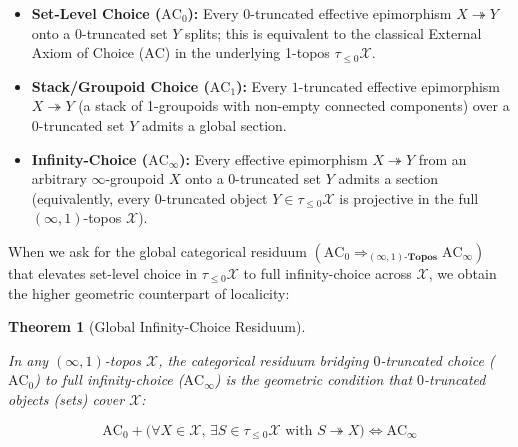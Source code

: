 \documentclass[10pt,twoside,openright]{book}
\theoremstyle{crmplain}
\newtheorem{theorem}{Theorem}[section]
\theoremstyle{crmdef}
\theoremstyle{crmremark}
\begin{document}
\begin{itemize}[leftmargin=1.5em]

  \item \textbf{Set-Level Choice ($\mathrm{AC}_0$):} Every $0$-truncated effective epimorphism $X \twoheadrightarrow Y$ onto a $0$-truncated set $Y$ splits; this is equivalent to the classical External Axiom of Choice ($\mathrm{AC}$) in the underlying 1-topos $\tau_{\le 0}\mathcal{X}$.

  \item \textbf{Stack/Groupoid Choice ($\mathrm{AC}_1$):} Every $1$-truncated effective epimorphism $X \twoheadrightarrow Y$ (a stack of 1-groupoids with non-empty connected components) over a $0$-truncated set $Y$ admits a global section.

  \item \textbf{Infinity-Choice ($\mathrm{AC}_\infty$):} Every effective epimorphism $X \twoheadrightarrow Y$ from an arbitrary $\infty$-groupoid $X$ onto a $0$-truncated set $Y$ admits a section (equivalently, every $0$-truncated object $Y \in \tau_{\le 0}\mathcal{X}$ is projective in the full $(\infty, 1)$-topos $\mathcal{X}$).

\end{itemize}

When we ask for the global categorical residuum $(\mathrm{AC}_0 \Rightarrow_{(\infty,1)\text{-}\mathbf{Topos}} \mathrm{AC}_\infty)$ that elevates set-level choice in $\tau_{\le 0}\mathcal{X}$ to full infinity-choice across $\mathcal{X}$, we obtain the higher geometric counterpart of localicity:

\begin{theorem}[Global Infinity-Choice Residuum]\label{thm:global-inf-choice}%
%

In any $(\infty, 1)$-topos $\mathcal{X}$, the categorical residuum bridging $0$-truncated choice ($\mathrm{AC}_0$) to full infinity-choice ($\mathrm{AC}_\infty$) is the geometric condition that $0$-truncated objects (sets) cover $\mathcal{X}$:

\[
  \mathrm{AC}_0 + \bigl(\forall X \in \mathcal{X},\, \exists S \in \tau_{\le 0}\mathcal{X} \text{ with } S \twoheadrightarrow X\bigr) \iff \mathrm{AC}_\infty
\]

\end{theorem}
\end{document}
